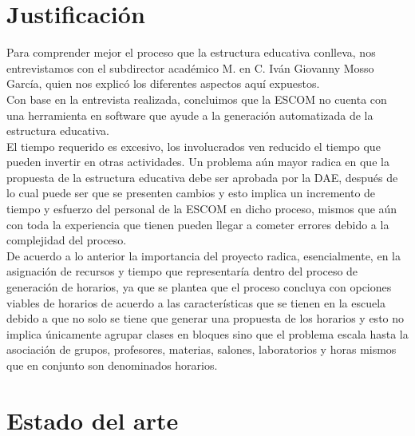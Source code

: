 \section{Justificación}
	Para comprender mejor el proceso que la estructura educativa conlleva, nos entrevistamos con el subdirector académico M. en C. Iván Giovanny Mosso García, quien nos explicó los diferentes aspectos aquí expuestos. \\
	
	Con base en la entrevista realizada, concluimos que la ESCOM no cuenta con una herramienta en software que ayude a la generación automatizada de la estructura educativa.  \\
	
	El tiempo requerido es excesivo, los involucrados ven reducido el tiempo que pueden invertir en otras actividades. Un problema aún mayor radica en que la propuesta de la estructura educativa debe ser aprobada por la DAE, después de lo cual puede ser
	que se presenten cambios y esto implica un incremento de tiempo y esfuerzo del personal de la ESCOM en dicho proceso, mismos que aún con toda la experiencia que tienen pueden llegar a cometer errores debido a la complejidad del proceso.  \\
	
	De acuerdo a lo anterior la importancia del proyecto radica, esencialmente, en la asignación de recursos y tiempo que representaría dentro del proceso de generación de horarios, ya que se plantea que el proceso concluya con opciones viables de horarios de acuerdo a las características que se tienen en la escuela debido a que no solo se tiene que generar una propuesta de los horarios y esto no implica únicamente agrupar clases en bloques sino que el problema escala hasta la asociación de grupos, profesores, materias, salones, laboratorios y horas mismos que en conjunto son denominados horarios.
	
\section{Estado del arte}

